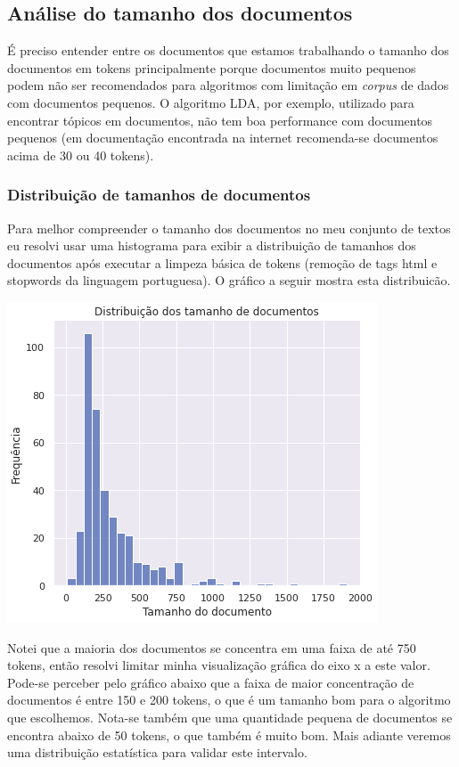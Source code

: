 \subsection{Análise do tamanho dos documentos}

É preciso entender entre os documentos que estamos trabalhando o tamanho dos documentos em tokens principalmente porque documentos 
muito pequenos podem não ser recomendados para algoritmos com limitação em \textit{corpus} de dados com documentos pequenos. 
O algoritmo LDA, por exemplo, utilizado para encontrar tópicos em documentos, não tem boa performance com documentos pequenos 
(em documentação encontrada na internet recomenda-se documentos acima de 30 ou 40 tokens).

\subsubsection{Distribuição de tamanhos de documentos}

Para melhor compreender o tamanho dos documentos no meu conjunto de textos eu resolvi usar uma histograma para exibir a distribuição de 
tamanhos dos documentos após executar a limpeza básica de tokens (remoção de tags html e stopwords da linguagem portuguesa). 
O gráfico a seguir mostra esta distribuicão.

\includegraphics[scale=0.75]{explore/resources/tamanho_documentos.png}

Notei que a maioria dos documentos se concentra em uma faixa de até 750 tokens, então resolvi limitar minha visualização gráfica do eixo 
x a este valor. Pode-se perceber pelo gráfico abaixo que a faixa de maior concentração de documentos é entre 150 e 200 tokens, 
o que é um tamanho bom para o algoritmo que escolhemos. Nota-se também que uma quantidade pequena de documentos se encontra abaixo de 50
tokens, o que também é muito bom. Mais adiante veremos uma distribuição estatística para validar este intervalo.

